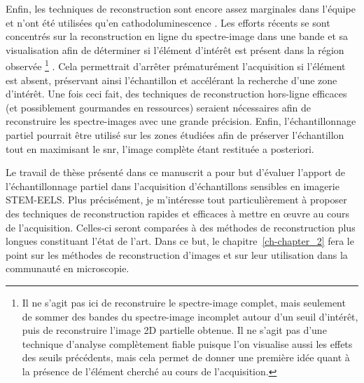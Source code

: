     Enfin, les techniques de reconstruction sont encore assez marginales dans l'équipe et n'ont été utilisées qu'en cathodoluminescence \cite{zobelli2019spatial}. 
    Les efforts récents se sont concentrés sur la reconstruction en ligne du spectre-image dans une bande et sa visualisation afin de déterminer si l'élément d'intérêt est présent dans la région observée%
    \footnote[][-10\baselineskip]{%
    Il ne s'agit pas ici de reconstruire le spectre-image complet, mais seulement de sommer des bandes du spectre-image incomplet autour d'un seuil d'intérêt, puis de reconstruire l'image 2D partielle obtenue. Il ne s'agit pas d'une technique d'analyse complètement fiable puisque l'on visualise aussi les effets des seuils précédents, mais cela permet de donner une première idée quant à la présence de l'élément cherché au cours de l'acquisition.}%
    . 
    Cela permettrait d'arrêter prématurément l'acquisition si l'élément est absent, préservant ainsi l'échantillon et accélérant la recherche d'une zone d'intérêt. 
    Une fois ceci fait, des techniques de reconstruction hors-ligne efficaces (et possiblement gourmandes en ressources) seraient nécessaires afin de reconstruire les spectre-images avec une grande précision. Enfin, l'échantillonnage partiel pourrait être utilisé sur les zones étudiées afin de préserver l'échantillon tout en maximisant le \gls{snr}, l'image complète étant restituée a posteriori.
    
    Le travail de thèse présenté dans ce manuscrit a pour but d'évaluer l'apport de l'échantillonnage partiel dans l'acquisition d'échantillons sensibles en imagerie STEM-EELS. Plus précisément, je m'intéresse tout particulièrement à proposer des techniques de reconstruction rapides et efficaces à mettre en \oe{}uvre au cours de l'acquisition. Celles-ci seront comparées à des méthodes de reconstruction plus longues constituant l'état de l'art. Dans ce but, le chapitre~\ref{ch-chapter_2} fera le point sur les méthodes de reconstruction d'images et sur leur utilisation dans la communauté en microscopie.
    
    
    
    
    
    


